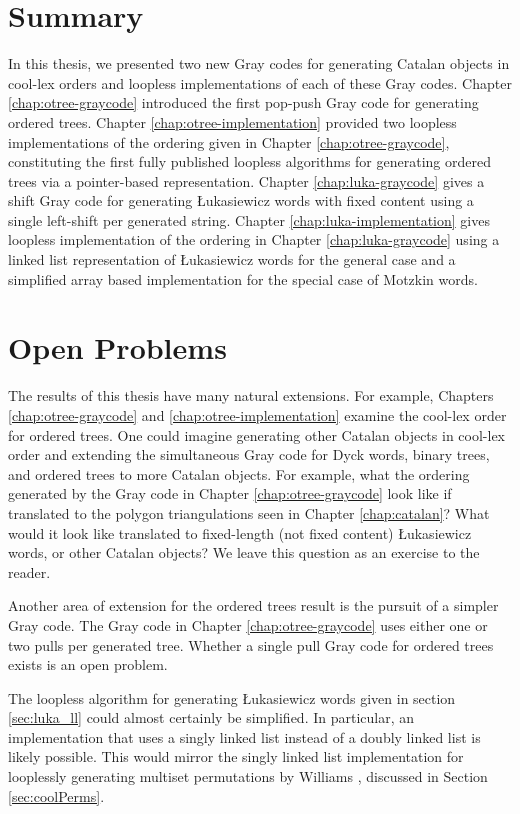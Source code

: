 \section{Summary} 
In this thesis, we presented two new Gray codes for generating Catalan objects in cool-lex orders and loopless implementations of each of these Gray codes.  Chapter \ref{chap:otree-graycode} introduced the first pop-push Gray code for generating ordered trees.  Chapter \ref{chap:otree-implementation} provided two loopless implementations of the ordering given in Chapter \ref{chap:otree-graycode}, constituting the first fully published loopless algorithms for generating ordered trees via a pointer-based representation.  Chapter \ref{chap:luka-graycode} gives a shift Gray code for generating Łukasiewicz words with fixed content using a single left-shift per generated string. Chapter \ref{chap:luka-implementation} gives loopless implementation of the ordering in Chapter \ref{chap:luka-graycode} using a linked list representation of Łukasiewicz words for the general case and a simplified array based implementation for the special case of Motzkin words.

\section{Open Problems}

The results of this thesis have many natural extensions.  For example, Chapters \ref{chap:otree-graycode} and \ref{chap:otree-implementation} examine the cool-lex order for ordered trees. One could imagine generating other Catalan objects in cool-lex order and extending the simultaneous Gray code for Dyck words, binary trees, and ordered trees to more Catalan objects.  For example, what the ordering generated by the Gray code in Chapter \ref{chap:otree-graycode} look like if translated to the polygon triangulations seen in Chapter \ref{chap:catalan}?  What would it look like translated to fixed-length (not fixed content) Łukasiewicz words, or other Catalan objects? We leave this question as an exercise to the reader.  

Another area of extension for the ordered trees result is the pursuit of a simpler Gray code. The Gray code in Chapter \ref{chap:otree-graycode} uses either one or two pulls per generated tree.  Whether a single pull Gray code for ordered trees exists is an open problem.  

The loopless algorithm for generating Łukasiewicz words given in section \ref{sec:luka_ll} could almost certainly be simplified.  In particular, an implementation that uses a singly linked list instead of a doubly linked list  is likely possible.  This would mirror the singly linked list implementation for looplessly generating multiset permutations by Williams \cite{williams2009loopless}, discussed in Section \ref{sec:coolPerms}.

